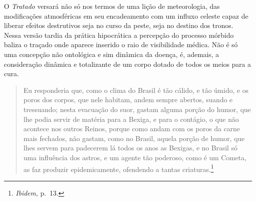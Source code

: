 O \emph{Tratado} versará não só nos termos de uma lição de meteorologia,
das modificações atmosféricas em seu encadeamento com um influxo celeste
capaz de liberar efeitos destrutivos seja no curso da peste, seja no
destino dos tronos. Nessa versão tardia da prática hipocrática a
percepção do processo mórbido baliza o traçado onde aparece inserido o
raio de visibilidade médica. Não é só uma concepção não ontológica e sim
dinâmica da doença, é, ademais, a consideração dinâmica e totalizante de
um corpo dotado de todos os meios para a cura.

\begin{quote}
Eu responderia que, como o clima do Brasil é tão cálido, e tão úmido, e
os poros dos corpos, que nele habitam, andem sempre abertos, suando e
tressuando; nesta evacuação do suor, gastam alguma porção do humor, que
lhe podia servir de matéria para a Bexiga, e para o contágio, o que não
acontece nos outros Reinos, porque como andam com os poros da carne mais
fechados, não gastam, como no Brasil, aquela porção de humor, que lhes
servem para padecerem lá todos os anos as Bexigas, e no Brasil só uma
influência dos astros, e um agente tão poderoso, como é um Cometa, as
faz produzir epidemicamente, ofendendo a tantas criaturas.\footnote{\emph{Ibidem,}
  p.~13.}
\end{quote}

